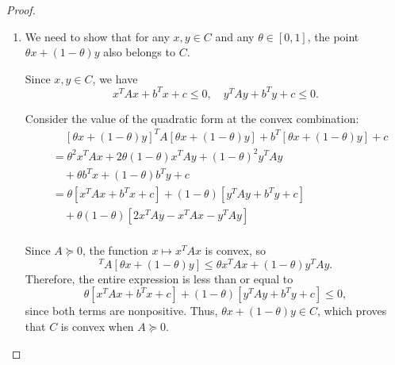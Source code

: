\begin{proof}
	\begin{enumerate}
		\item
		      We need to show that for any \(x, y \in C\) and any \(\theta \in [0,1]\), the point \(\theta x + (1-\theta) y\) also belongs to \(C\).

		      Since \(x, y \in C\), we have
		      \begin{equation*}
			      x^{T}Ax + b^{T}x + c \leq 0, \quad y^{T}Ay + b^{T}y + c \leq 0.
		      \end{equation*}

		      Consider the value of the quadratic form at the convex combination:
		      \begin{align*}
			       & \quad\, [\theta x + (1-\theta) y]^T A [\theta x + (1-\theta) y] + b^T [\theta x + (1-\theta) y] + c \\
			       & = \theta^2 x^T A x + 2\theta(1-\theta) x^T A y + (1-\theta)^2 y^T A y                               \\
			       & \quad + \theta b^T x + (1-\theta) b^T y + c                                                         \\
			       & = \theta [x^T A x + b^T x + c] + (1-\theta)[y^T A y + b^T y + c]                                    \\
			       & \quad + \theta(1-\theta) [2 x^T A y - x^T A x - y^T A y]                                            \\
		      \end{align*}

		      Since \(A \succeq 0\), the function \(x \mapsto x^T A x\) is convex, so
		      \begin{equation*}
			      [\theta x + (1-\theta) y]^T A [\theta x + (1-\theta) y] \leq \theta x^T A x + (1-\theta) y^T A y.
		      \end{equation*}
		      Therefore, the entire expression is less than or equal to
		      \begin{equation*}
			      \theta [x^T A x + b^T x + c] + (1-\theta)[y^T A y + b^T y + c] \leq 0,
		      \end{equation*}
		      since both terms are nonpositive. Thus, \(\theta x + (1-\theta) y \in C\), which proves that \(C\) is convex when \(A \succeq 0\).
	\end{enumerate}

\end{proof}
